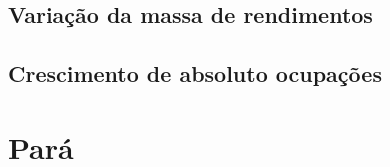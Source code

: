 \documentclass[8pt]{beamer}
\begin{document}
\subsection{Variação da massa de rendimentos}

\begin{frame}
\textit{\hyperlink{indice_principal_amz_mt}{}}

\end{frame}

\begin{frame}
\textit{\hyperlink{indice_principal_amz_mt}{}}

\end{frame}

\subsection{Crescimento de absoluto ocupações}

\begin{frame}
\textit{\hyperlink{indice_principal_amz_mt}{}}

\end{frame}

\begin{frame}
\textit{\hyperlink{indice_principal_amz_mt}{}}

\end{frame}

\section{Pará}
\end{document}

